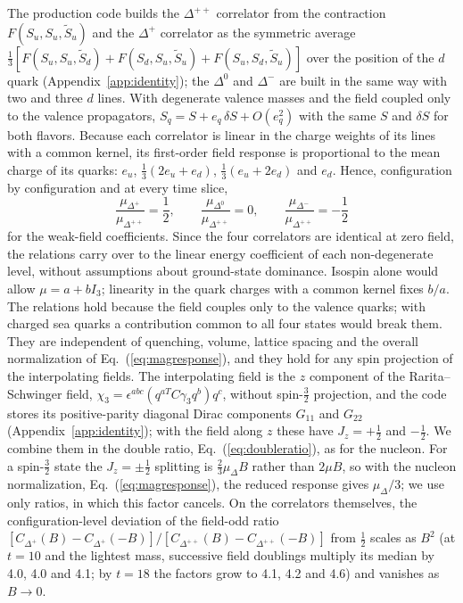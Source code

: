 \documentclass[aps,prd,preprint,nofootinbib,floatfix]{revtex4-2}
\begin{document}
The production code builds the $\Delta^{++}$ correlator from the contraction $F(S_u,S_u,\tilde S_u)$ and the $\Delta^+$ correlator as the symmetric average $\tfrac13[F(S_u,S_u,\tilde S_d)+F(S_d,S_u,\tilde S_u)+F(S_u,S_d,\tilde S_u)]$ over the position of the $d$ quark (Appendix~\ref{app:identity}); the $\Delta^0$ and $\Delta^-$ are built in the same way with two and three $d$ lines. With degenerate valence masses and the field coupled only to the valence propagators, $S_q=S+e_q\,\delta S+O(e_q^2)$ with the same $S$ and $\delta S$ for both flavors. Because each correlator is linear in the charge weights of its lines with a common kernel, its first-order field response is proportional to the mean charge of its quarks: $e_u$, $\tfrac13(2e_u+e_d)$, $\tfrac13(e_u+2e_d)$ and $e_d$. Hence, configuration by configuration and at every time slice,
\begin{equation}
\frac{\mu_{\Delta^+}}{\mu_{\Delta^{++}}}=\frac12,\qquad \frac{\mu_{\Delta^0}}{\mu_{\Delta^{++}}}=0,\qquad \frac{\mu_{\Delta^-}}{\mu_{\Delta^{++}}}=-\frac12
\label{eq:deltaratio}
\end{equation}
for the weak-field coefficients. Since the four correlators are identical at zero field, the relations carry over to the linear energy coefficient of each non-degenerate level, without assumptions about ground-state dominance. Isospin alone would allow $\mu=a+bI_3$; linearity in the quark charges with a common kernel fixes $b/a$. The relations hold because the field couples only to the valence quarks; with charged sea quarks a contribution common to all four states would break them. They are independent of quenching, volume, lattice spacing and the overall normalization of Eq.~(\ref{eq:magresponse}), and they hold for any spin projection of the interpolating fields. The interpolating field is the $z$ component of the Rarita--Schwinger field, $\chi_3=\epsilon^{abc}(q^{aT}C\gamma_3q^b)q^c$, without spin-$\tfrac32$ projection, and the code stores its positive-parity diagonal Dirac components $G_{11}$ and $G_{22}$ (Appendix~\ref{app:identity}); with the field along $z$ these have $J_z=+\tfrac12$ and $-\tfrac12$. We combine them in the double ratio, Eq.~(\ref{eq:doubleratio}), as for the nucleon. For a spin-$\tfrac32$ state the $J_z=\pm\tfrac12$ splitting is $\tfrac23\mu_\Delta B$ rather than $2\mu B$, so with the nucleon normalization, Eq.~(\ref{eq:magresponse}), the reduced response gives $\mu_\Delta/3$; we use only ratios, in which this factor cancels. On the correlators themselves, the configuration-level deviation of the field-odd ratio $[C_{\Delta^+}(B)-C_{\Delta^+}(-B)]/[C_{\Delta^{++}}(B)-C_{\Delta^{++}}(-B)]$ from $\tfrac12$ scales as $B^2$ (at $t=10$ and the lightest mass, successive field doublings multiply its median by 4.0, 4.0 and 4.1; by $t=18$ the factors grow to 4.1, 4.2 and 4.6) and vanishes as $B\to0$.
\end{document}
